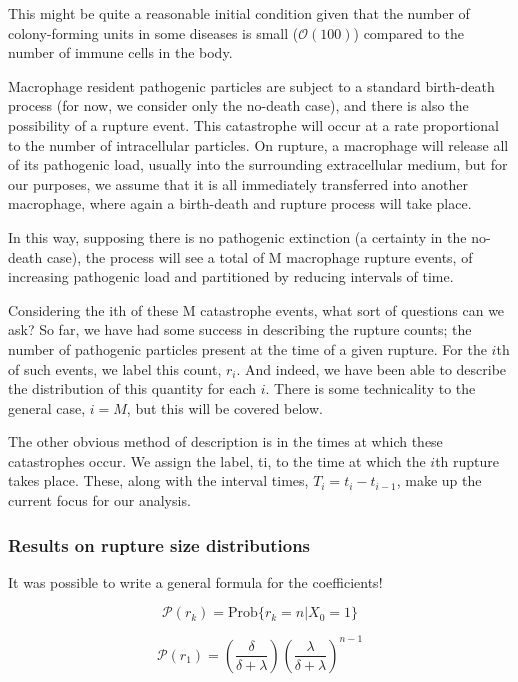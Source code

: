 This might be quite a reasonable initial condition given that the number of colony-forming units in some diseases is small ($\mathcal{O}(100)$) compared to the number of immune cells in the body.


Macrophage resident pathogenic particles are subject to a standard birth-death process (for now, we consider only the no-death case), and there is also the possibility of a rupture event. This catastrophe will occur at a rate proportional to the number of intracellular particles. On rupture, a macrophage will release all of its pathogenic load, usually into the surrounding extracellular medium, but for our purposes, we assume that it is all immediately transferred into another macrophage, where again a birth-death and rupture process will take place. 

In this way, supposing there is no pathogenic extinction (a certainty in the no-death case), the process will see a total of M macrophage rupture events, of increasing pathogenic load and partitioned by reducing intervals of time. 

Considering the ith of these M catastrophe events, what sort of questions can we ask? So far, we have had some success in describing the rupture counts; the number of pathogenic particles present at the time of a given rupture. For the $i$th of such events, we label this count, $r_i$. And indeed, we have been able to describe the distribution of this quantity for each $i$. There is some technicality to the general case, $i = M$, but this will be covered below. 

The other obvious method of description is in the times at which these catastrophes occur. We assign the label, ti, to the time at which the $i$th rupture takes place. These, along with the interval times, $T_i = t_i - t_{i-1}$, make up the current focus for our analysis. 







\subsubsection*{Results on rupture size distributions}




It was possible to write a general formula for the coefficients!

$$\mathcal{P}(r_k) = \mathrm{Prob}\{r_k = n|X_0=1\}$$

$$\mathcal{P}(r_1) = \left(\frac{\delta}{\delta + \lambda}\right)^{} \left(\frac{\lambda}{\delta + \lambda}\right)^{n-1}$$


